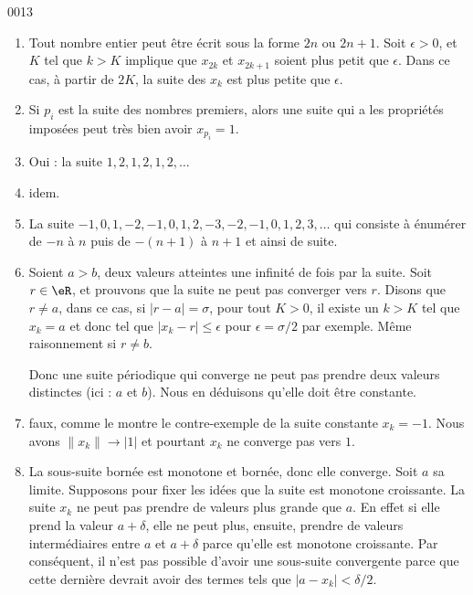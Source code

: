 
\begin{corrige}{0013}

\begin{enumerate}
\item Tout nombre entier peut être écrit sous la forme $2n$ ou $2n+1$. Soit $\epsilon>0$, et $K$ tel que $k>K$ implique que $x_{2k}$ et $x_{2k+1}$ soient plus petit que $\epsilon$. Dans ce cas, à partir de $2K$, la suite des $x_k$ est plus petite que $\epsilon$.
\item Si $p_i$ est la suite des nombres premiers, alors une suite qui a les propriétés imposées peut très bien avoir $x_{p_i}=1$.
\item Oui : la suite $1,2,1,2,1,2,\ldots$
\item idem.
\item La suite $-1,0,1,-2,-1,0,1,2,-3,-2,-1,0,1,2,3,\ldots$ qui consiste à énumérer de $-n$ à $n$ puis de $-(n+1)$ à $n+1$ et ainsi de suite.
\item Soient $a>b$, deux valeurs atteintes une infinité de fois par la suite. Soit $r\in\eR$, et prouvons que la suite ne peut pas converger vers $r$. Disons que $r\neq a$, dans ce cas, si $| r-a |=\sigma$, pour tout $K>0$, il existe un $k>K$ tel que $x_k=a$ et donc tel que $| x_k-r |\leq\epsilon$ pour $\epsilon=\sigma/2$ par exemple. Même raisonnement si $r\neq b$.

Donc une suite périodique qui converge ne peut pas prendre deux valeurs distinctes (ici : $a$ et $b$). Nous en déduisons qu'elle doit être constante.

\item faux, comme le montre le contre-exemple de la suite constante $x_k=-1$. Nous avons $\| x_k \|\to| 1 |$ et pourtant $x_k$ ne converge pas vers $1$.

\item La sous-suite bornée est monotone et bornée, donc elle converge. Soit $a$ sa limite. Supposons pour fixer les idées que la suite est monotone croissante. La suite $x_k$ ne peut pas prendre de valeurs plus grande que $a$. En effet si elle prend la valeur $a+\delta$, elle ne peut plus, ensuite, prendre de valeurs intermédiaires entre $a$ et $a+\delta$ parce qu'elle est monotone croissante. Par conséquent, il n'est pas possible d'avoir une sous-suite convergente parce que cette dernière devrait avoir des termes tels que $| a-x_k |<\delta/2$.


\end{enumerate}
\end{corrige}
